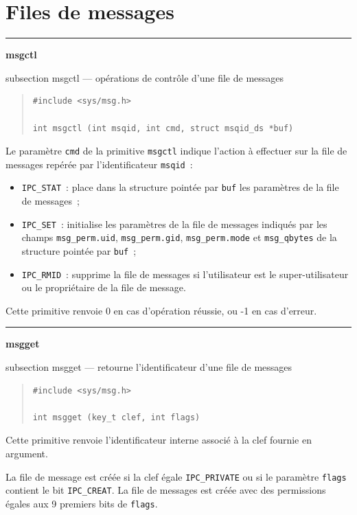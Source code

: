 \documentclass [twoside] {report}
\newcommand {\primitive} [1]
    {
	\phantomsection
	{\large \textbf {#1}}
	\addcontentsline {toc} {subsection} {#1}
    }
\newcommand {\separation}
    {
	\vspace {5mm}
	\nopagebreak
	\hrule
    }
\begin{document}
\section* {Files de messages}


\separation
\primitive {msgctl} --- opérations de contrôle d'une file de messages

\begin {quote}
\begin {verbatim}
#include <sys/msg.h>

int msgctl (int msqid, int cmd, struct msqid_ds *buf)
\end{verbatim}
\end {quote}

Le paramètre \texttt {cmd} de la primitive \texttt {msgctl} indique l'action à
effectuer sur la file de messages repérée par l'identificateur
\texttt {msqid}~:

\begin {itemize}
    \item \texttt {IPC\_STAT}~: place dans la structure pointée par
	\texttt {buf} les paramètres de la file de messages~;
    \item \texttt {IPC\_SET}~: initialise les paramètres de la file de
	messages indiqués par les champs \texttt {msg\_perm.uid},
	\texttt {msg\_perm.gid}, \texttt {msg\_perm.mode} et \texttt {msg\_qbytes}
	de la structure pointée par \texttt {buf}~;
    \item \texttt {IPC\_RMID}~: supprime la file de messages si
	l'utilisateur est le super-utilisateur ou le propriétaire de
	la file de message.
\end {itemize}

Cette primitive renvoie 0 en cas d'opération
réussie, ou -1 en cas d'erreur.


\separation
\primitive {msgget} --- retourne l'identificateur d'une file de messages

\begin {quote}
\begin {verbatim}
#include <sys/msg.h>

int msgget (key_t clef, int flags)
\end{verbatim}
\end {quote}

Cette primitive renvoie l'identificateur interne associé à la clef
fournie en argument.

La file de message est créée si la clef égale \texttt {IPC\_PRIVATE} ou si
le paramètre \texttt {flags} contient le bit \texttt {IPC\_CREAT}.  La file de
messages est créée avec des permissions égales aux 9 premiers bits de
\texttt {flags}.
\end{document}
